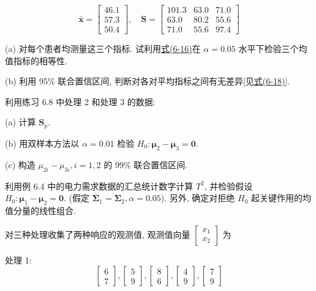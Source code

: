 
\[
\bar{\mathbf{x}}=\begin{bmatrix}46.1\\57.3\\50.4\end{bmatrix},\quad \mathbf{S}=\begin{bmatrix}101.3&63.0&71.0\\63.0&80.2&55.6\\71.0&55.6&97.4\end{bmatrix}
\]

\noindent (a) 对每个患者均测量这三个指标. 试利用\hyperref[eq:6-16]{式(6-16)}在 $\alpha=0.05$ 水平下检验三个均值指标的相等性.

\noindent (b) 利用 95\% 联合置信区间, 判断对各对平均指标之间有无差异[见\hyperref[eq:6-18]{式(6-18)}].

\quad 利用练习 6.8 中处理 2 和处理 3 的数据:

\noindent (a) 计算 $\mathbf{S}_{p}$.

\noindent (b) 用双样本方法以 $\alpha=0.01$ 检验 $H_0: \boldsymbol{\mu}_2-\boldsymbol{\mu}_3=\mathbf{0}$.

\noindent (c) 构造 $\mu_{2i}-\mu_{3i}, i=1,2$ 的 99\% 联合置信区间.

\quad 利用例 6.4 中的电力需求数据的汇总统计数字计算 $T^2$, 并检验假设 $H_0: \boldsymbol{\mu}_1-\boldsymbol{\mu}_2=\mathbf{0}$. (假定 $\boldsymbol{\Sigma}_1=\boldsymbol{\Sigma}_2, \alpha=0.05$). 另外, 确定对拒绝 $H_0$ 起关键作用的均值分量的线性组合.

\quad 对三种处理收集了两种响应的观测值, 观测值向量 $\begin{bmatrix}x_1\\x_2\end{bmatrix}$ 为

处理 1:
\[
\begin{bmatrix}6\\7\end{bmatrix},\begin{bmatrix}5\\9\end{bmatrix},\begin{bmatrix}8\\6\end{bmatrix},\begin{bmatrix}4\\9\end{bmatrix},\begin{bmatrix}7\\9\end{bmatrix}
\]

